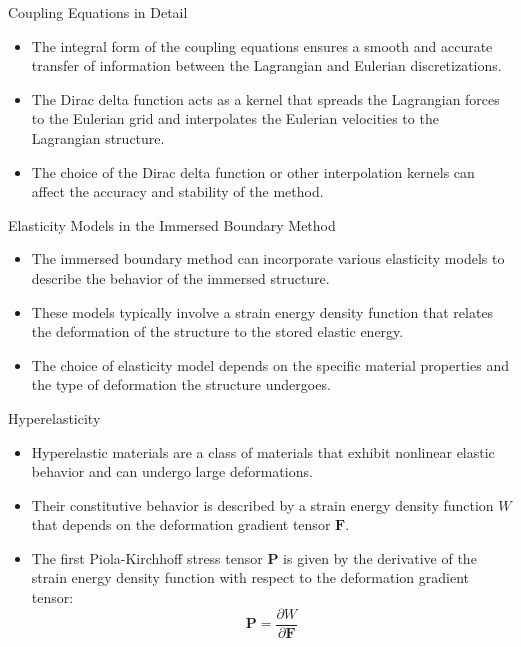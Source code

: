 \documentclass{beamer}
\begin{document}
\begin{frame}{Coupling Equations in Detail}
    \begin{itemize}
        \item The integral form of the coupling equations ensures a smooth and accurate transfer of information between the Lagrangian and Eulerian discretizations.
        \item The Dirac delta function acts as a kernel that spreads the Lagrangian forces to the Eulerian grid and interpolates the Eulerian velocities to the Lagrangian structure.
        \item The choice of the Dirac delta function or other interpolation kernels can affect the accuracy and stability of the method.
    \end{itemize}
\end{frame}

\begin{frame}{Elasticity Models in the Immersed Boundary Method}
\begin{itemize}
\item The immersed boundary method can incorporate various elasticity models to describe the behavior of the immersed structure.
\item These models typically involve a strain energy density function that relates the deformation of the structure to the stored elastic energy.
\item The choice of elasticity model depends on the specific material properties and the type of deformation the structure undergoes.
\end{itemize}
\end{frame}

\begin{frame}{Hyperelasticity}
\begin{itemize}
\item Hyperelastic materials are a class of materials that exhibit nonlinear elastic behavior and can undergo large deformations.
\item Their constitutive behavior is described by a strain energy density function $W$ that depends on the deformation gradient tensor $\mathbf{F}$.
\item The first Piola-Kirchhoff stress tensor $\mathbf{P}$ is given by the derivative of the strain energy density function with respect to the deformation gradient tensor:
\begin{equation*}
\mathbf{P} = \frac{\partial W}{\partial \mathbf{F}}
\end{equation*}
\end{itemize}
\end{frame}
\end{document}
